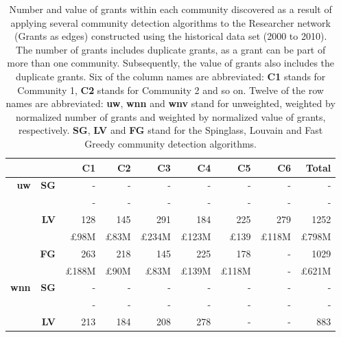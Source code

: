 \begin{table}[!htbp]
\setlength\tabcolsep{5.8pt}
\centering
\caption[Number and value of grants within each community discovered in the Researcher network (Grants as edges) constructed using the historical data set (2000 to 2010)]{Number and value of grants within each community discovered as a result of applying several community detection algorithms to the Researcher network (Grants as edges) constructed using the historical data set (2000 to 2010). The number of grants includes duplicate grants, as a grant can be part of more than one community. Subsequently, the value of grants also includes the duplicate grants. Six of the column names are abbreviated: \textbf{C1} stands for Community 1, \textbf{C2} stands for Community 2 and so on. Twelve of the row names are abbreviated: \textbf{uw}, \textbf{wnn} and \textbf{wnv} stand for unweighted, weighted by normalized number of grants and weighted by normalized value of grants, respectively. \textbf{SG}, \textbf{LV} and \textbf{FG} stand for the Spinglass, Louvain and Fast Greedy community detection algorithms.}
\label{table:research_b_past1_grants1_appendix}
\begin{tabular}{r|r|r|r|r|r|r|r|r}
\multicolumn{2}{c|}{} & \textbf{C1} & \textbf{C2} & \textbf{C3} & \textbf{C4} & \textbf{C5} & \textbf{C6} & \textbf{Total}\\
\hline
\multirow{6}{*}{\textbf{uw}}
& \multirow{2}{*}{\textbf{SG}}
& {-} & {-} & {-} & {-} & {-} & {-} & {-}\\
& {} & {-} & {-} & {-} & {-} & {-} & {-} & {-}\\
\cline{2-9}
& \multirow{2}{*}{\textbf{LV}}
& {128} & {145} & {291} & {184} & {225} & {279} & {1252}\\
& {} & {\pounds98M} & {\pounds83M} & {\pounds234M} & {\pounds123M} & {\pounds139} & {\pounds118M} & {\pounds798M}\\
\cline{2-9}
& \multirow{2}{*}{\textbf{FG}}
& {263} & {218} & {145} & {225} & {178} & {-} & {1029}\\
& {} & {\pounds188M} & {\pounds90M} & {\pounds83M} & {\pounds139M} & {\pounds118M} & {-} & {\pounds621M}\\
\hline
\multirow{6}{*}{\textbf{wnn}}
& \multirow{2}{*}{\textbf{SG}}
& {-} & {-} & {-} & {-} & {-} & {-} & {-}\\
& {} & {-} & {-} & {-} & {-} & {-} & {-} & {-}\\
\cline{2-9}
& \multirow{2}{*}{\textbf{LV}}
& {213} & {184} & {208} & {278} & {-} & {-} & {883}\\

\end{tabular}
\end{table}
